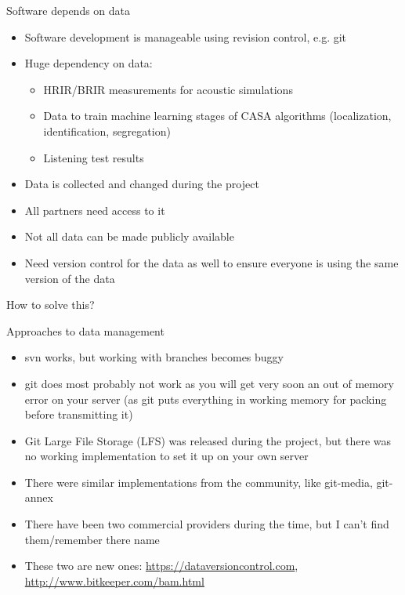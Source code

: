 \documentclass{beamer}
\begin{document}
\begin{frame}{Software depends on data}

    \begin{itemize}
        \item Software development is manageable using revision control, e.g. git
        \item Huge dependency on data:
            \begin{itemize}
                \item HRIR/BRIR measurements for acoustic simulations
                \item Data to train machine learning stages of CASA algorithms
                    (localization, identification, segregation)
                \item Listening test results
            \end{itemize}
        \item Data is collected and changed during the project
        \item All partners need access to it
        \item Not all data can be made publicly available
        \item Need version control for the data as well to ensure everyone is
            using the same version of the data
    \end{itemize}

    How to solve this?

\end{frame}

\begin{frame}{Approaches to data management}

    \begin{itemize}
        \item svn works, but working with branches becomes buggy
        \item git does most probably not work as you will get very soon an out
            of memory error on your server (as git puts everything in working
            memory for packing before transmitting it)
        \item Git Large File Storage (LFS) was released during the project, but
            there was no working implementation to set it up on your own server
        \item There were similar implementations from the community, like
            git-media, git-annex
        \item There have been two commercial providers during the time, but I
            can't find them/remember there name
        \item These two are new ones: \url{https://dataversioncontrol.com},
            \url{http://www.bitkeeper.com/bam.html}
    \end{itemize}

\end{frame}
\end{document}
